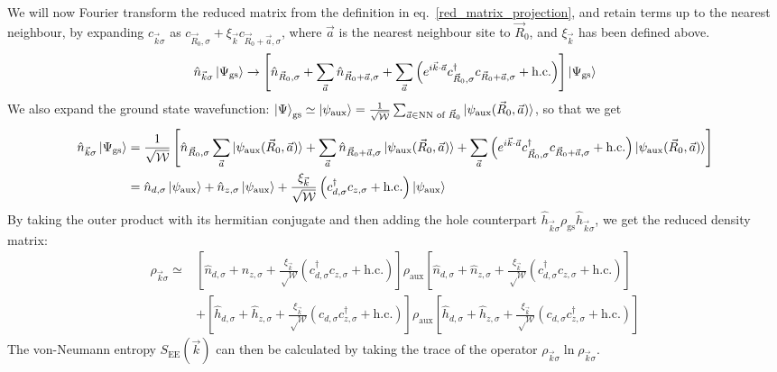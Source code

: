 \documentclass[prb]{revtex4-2}
\begin{document}
We will now Fourier transform the reduced matrix from the definition in eq.~\ref{red_matrix_projection}, and retain terms up to the nearest neighbour, by expanding \(c_{\vec k\sigma}\) as \(c_{\vec R_0,\sigma} + \xi_{\vec k}c_{\vec R_0 + \vec a,\sigma}\), where \(\vec a\) is the nearest neighbour site to \(\vec R_0\), and \(\xi_{\vec k}\) has been defined above.
\begin{equation}\begin{aligned}
	\hat n_{\vec k\sigma}\ket{\Psi_\text{gs}} \to  \left[ \hat n_{\vec R_0,\sigma} + \sum_{\vec a} \hat n_{\vec R_0 + \vec a,\sigma} + \sum_{\vec a}\left( e^{i \vec{k}\cdot\vec{a}}c^\dagger_{\vec R_0,\sigma}c_{\vec R_0 + \vec a,\sigma} + \text{h.c.} \right) \right]\ket{\Psi_\text{gs}}
\end{aligned}\end{equation}
We also expand the ground state wavefunction: \(\ket{\Psi}_\text{gs} \simeq \ket{\psi_\text{aux}} = \frac{1}{\sqrt \mathcal{W}}\sum_{\vec a \in \text{NN of }\vec R_0}\ket{\psi_\text{aux}(\vec R_0,\vec a)}\), so that we get
\begin{equation}\begin{aligned}
	\hat n_{\vec k\sigma}\ket{\Psi_\text{gs}} &= \frac{1}{\sqrt \mathcal{W}}\left[ \hat n_{\vec R_0,\sigma} \sum_{\vec a}\ket{\psi_\text{aux}(\vec R_0,\vec a)} + \sum_{\vec a} \hat n_{\vec R_0 + \vec a,\sigma}\ket{\psi_\text{aux}(\vec R_0,\vec a)} + \sum_{\vec a}\left( e^{i \vec{k}\cdot\vec{a}}c^\dagger_{\vec R_0,\sigma}c_{\vec R_0 + \vec a,\sigma} + \text{h.c.} \right) \ket{\psi_\text{aux}(\vec R_0,\vec a)}\right]\\
						  &=\hat n_{d,\sigma} \ket{\psi_\text{aux}} + \hat n_{z,\sigma}\ket{\psi_\text{aux}} + \frac{\xi_{\vec k}}{\sqrt \mathcal{W}}\left(c^\dagger_{d,\sigma}c_{z,\sigma} + \text{h.c.} \right) \ket{\psi_\text{aux}}
\end{aligned}\end{equation}
By taking the outer product with its hermitian conjugate and then adding the hole counterpart \(\hat h_{\vec k\sigma}\rho_\text{gs} \hat h_{\vec k\sigma}\), we get the reduced density matrix:
\begin{equation}\begin{aligned}
	\rho_{\vec k\sigma} \simeq& \left[\hat n_{d,\sigma} + \hat n_{z,\sigma} + \frac{\xi_{\vec k}}{\sqrt \mathcal{W}}\left(c^\dagger_{d,\sigma}c_{z,\sigma} + \text{h.c.} \right)\right] \rho_\text{aux} \left[\hat n_{d,\sigma} + \hat n_{z,\sigma} + \frac{\xi_{\vec k}}{\sqrt \mathcal{W}}\left(c^\dagger_{d,\sigma}c_{z,\sigma} + \text{h.c.} \right)\right]\\
				  &+ \left[\hat h_{d,\sigma} + \hat h_{z,\sigma} + \frac{\xi_{\vec k}}{\sqrt \mathcal{W}}\left(c_{d,\sigma}c^\dagger_{z,\sigma} + \text{h.c.} \right)\right] \rho_\text{aux} \left[\hat h_{d,\sigma} + \hat h_{z,\sigma} + \frac{\xi_{\vec k}}{\sqrt \mathcal{W}}\left(c_{d,\sigma}c^\dagger_{z,\sigma} + \text{h.c.} \right)\right]\label{density_matrix_kspace}
\end{aligned}\end{equation}
The von-Neumann entropy \(S_\text{EE}(\vec k)\) can then be calculated by taking the trace of the operator \(\rho_{\vec k\sigma}\ln \rho_{\vec k\sigma}\).
\end{document}
